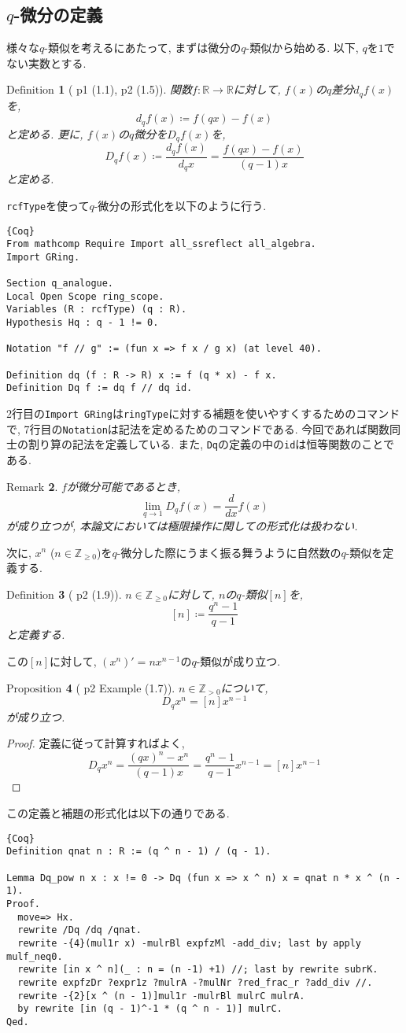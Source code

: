 \documentclass[11pt]{jsreport}
\theoremstyle{mystyle}
\newtheorem{df}{$\textrm{Definition}$}[section]
\newtheorem{prop}[df]{$\textrm{Proposition}$}
\newtheorem{rmk}[df]{$\textrm{Remark}$}
\newcommand{\bdf}{\begin{shadebox} \begin{df}}
\newcommand{\edf}{\end{df} \end{shadebox}}
\newcommand{\bprop}{\begin{shadebox} \begin{prop}}
\newcommand{\eprop}{\end{prop} \end{shadebox}}
\newcommand{\brmk}{\begin{rmk}}
\newcommand{\ermk}{\end{rmk}}
\newcommand{\bpf}{\begin{proof}}
\newcommand{\epf}{\end{proof}}
\newcommand{\ra}{\rightarrow}
\newcommand{\Z}{\mathbb{Z}}
\newcommand{\R}{\mathbb{R}}
\newcommand{\0}{\textbf{0}}
\begin{document}
\subsection{$q$-微分の定義}
様々な$q$-類似を考えるにあたって, まずは微分の$q$-類似から始める. 以下, $q$を$1$でない実数とする. 
\bdf[\cite{Kac} p1 (1.1), p2 (1.5)]
  関数$f : \R \to \R$に対して, $f(x)$の$q$差分$d_q f(x)$を, 
  \[
    d_q f(x) \coloneqq f (qx) - f(x)
  \]
  と定める. 更に, $f(x)$の$q$微分を$D_q f(x)$を, 
  \[
    D_q f(x) \coloneqq \frac{d_q f(x)}{d_q x} = \frac{f(qx) - f(x)}{(q - 1) x}
  \]
  と定める. 
\edf
{\tt rcfType}を使って$q$-微分の形式化を以下のように行う. 
\begin{lstlisting}{Coq}
From mathcomp Require Import all_ssreflect all_algebra.
Import GRing.

Section q_analogue.
Local Open Scope ring_scope.
Variables (R : rcfType) (q : R).
Hypothesis Hq : q - 1 != 0.

Notation "f // g" := (fun x => f x / g x) (at level 40).

Definition dq (f : R -> R) x := f (q * x) - f x.
Definition Dq f := dq f // dq id. \end{lstlisting}
2行目の{\tt Import GRing}は{\tt ringType}に対する補題を使いやすくするためのコマンドで, 
7行目の{\tt Notation}は記法を定めるためのコマンドである. 今回であれば関数同士の割り算の記法を定義している. また, {\tt Dq}の定義の中の{\tt id}は恒等関数のことである. 
\brmk
  $f$が微分可能であるとき, 
  \[
    \lim_{q\ra1} D_qf(x) = \frac{d}{dx}f(x)
  \] 
  が成り立つが, 本論文においては極限操作に関しての形式化は扱わない. 
\ermk
次に, $x ^ n$ ($n \in \Z_{\ge 0}$)を$q$-微分した際にうまく振る舞うように自然数の$q$-類似を定義する. 
\bdf[\cite{Kac} p2 (1.9)]
  $n \in \Z_{\ge 0}$に対して, $n$の$q$-類似$[n]$を, 
  \[
    [n] \coloneqq \frac{q^n - 1}{q - 1}
  \]
  と定義する. 
\edf
この$[n]$に対して, $(x^n)' = n x^{n-1}$の$q$-類似が成り立つ.
\bprop[\cite{Kac} p2 Example (1.7)]
  $n \in \Z_{>0}$について, 
  \[
    D_q x^n = [n] x ^{n - 1}
  \]
  が成り立つ. 
\eprop
\bpf
  定義に従って計算すればよく, 
  \[
    D_q x ^ n = \frac{(qx) ^ n - x ^ n}{(q - 1) x}
                 = \frac{q^n - 1}{q - 1} x ^ {n - 1}
                 = [n] x ^ {n - 1}
  \] 
\epf
この定義と補題の形式化は以下の通りである. 
\begin{lstlisting}{Coq}
Definition qnat n : R := (q ^ n - 1) / (q - 1).

Lemma Dq_pow n x : x != 0 -> Dq (fun x => x ^ n) x = qnat n * x ^ (n - 1).
Proof.
  move=> Hx.
  rewrite /Dq /dq /qnat.
  rewrite -{4}(mul1r x) -mulrBl expfzMl -add_div; last by apply mulf_neq0.
  rewrite [in x ^ n](_ : n = (n -1) +1) //; last by rewrite subrK.
  rewrite expfzDr ?expr1z ?mulrA -?mulNr ?red_frac_r ?add_div //.
  rewrite -{2}[x ^ (n - 1)]mul1r -mulrBl mulrC mulrA.
  by rewrite [in (q - 1)^-1 * (q ^ n - 1)] mulrC.
Qed.
\end{lstlisting}
\end{document}
